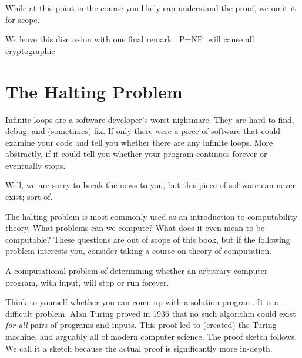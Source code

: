 \documentclass[main.tex]{subfiles}
\begin{document}
\begin{thm}
	
\end{thm}

\begin{rem}
	While at this point in the course you likely can understand the proof, we omit it for scope.
\end{rem}

We leave this discussion with one final remark.  \(\text{P}=\text{NP}\) will cause all cryptographic 

\section{The Halting Problem}

Infinite loops are a software developer's worst nightmare. They are hard to find, debug, and (sometimes) fix. If only there were a piece of software that could examine your code and tell you whether there are any infinite loops. More abstractly, if it could tell you whether your program continues forever or eventually stops.

Well, we are sorry to break the news to you, but this piece of software can never exist; sort-of.

The halting problem is most commonly used as an introduction to computability theory. What problems can we compute? What does it even mean to be computable? These questions are out of scope of this book, but if the following problem interests you, consider taking a course on theory of computation.

\begin{defn}
	A computational problem of determining whether an arbitrary computer program, with input, will stop or run forever.
\end{defn}

Think to yourself whether you can come up with a solution program. It is a difficult problem. Alan Turing proved in 1936 that no such algorithm could exist \textit{for all} pairs of programs and inputs. This proof led to (created) the Turing machine, and arguably all of modern computer science. The proof sketch follows. We call it a sketch because the actual proof is significantly more in-depth.
\end{document}
